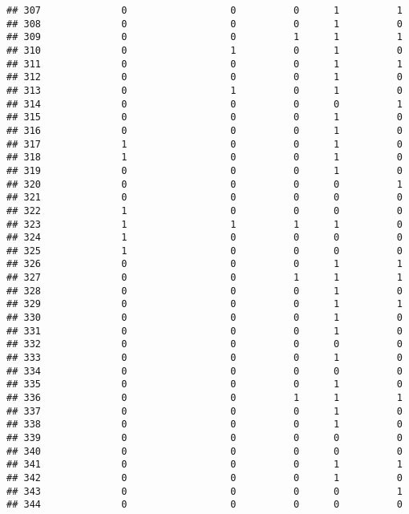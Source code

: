 \documentclass[
]{article}
\begin{document}
\begin{verbatim}
## 307              0                  0          0      1          1
## 308              0                  0          0      1          0
## 309              0                  0          1      1          1
## 310              0                  1          0      1          0
## 311              0                  0          0      1          1
## 312              0                  0          0      1          0
## 313              0                  1          0      1          0
## 314              0                  0          0      0          1
## 315              0                  0          0      1          0
## 316              0                  0          0      1          0
## 317              1                  0          0      1          0
## 318              1                  0          0      1          0
## 319              0                  0          0      1          0
## 320              0                  0          0      0          1
## 321              0                  0          0      0          0
## 322              1                  0          0      0          0
## 323              1                  1          1      1          0
## 324              1                  0          0      0          0
## 325              1                  0          0      0          0
## 326              0                  0          0      1          1
## 327              0                  0          1      1          1
## 328              0                  0          0      1          0
## 329              0                  0          0      1          1
## 330              0                  0          0      1          0
## 331              0                  0          0      1          0
## 332              0                  0          0      0          0
## 333              0                  0          0      1          0
## 334              0                  0          0      0          0
## 335              0                  0          0      1          0
## 336              0                  0          1      1          1
## 337              0                  0          0      1          0
## 338              0                  0          0      1          0
## 339              0                  0          0      0          0
## 340              0                  0          0      0          0
## 341              0                  0          0      1          1
## 342              0                  0          0      1          0
## 343              0                  0          0      0          1
## 344              0                  0          0      0          0

\end{verbatim}
\end{document}
